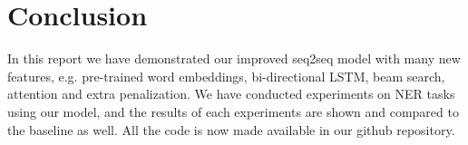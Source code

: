 \documentclass[11pt,a4paper]{article}
\begin{document}
\section{Conclusion} \label{sec:conclusion}
In this report we have demonstrated our improved seq2seq model with many new features, e.g. pre-trained word embeddings, bi-directional LSTM, beam search, attention and extra penalization. We have conducted experiments on NER tasks using our model, and the results of each experiments are shown and compared to the baseline as well. All the code is now made available in our github repository. 





\end{document}
